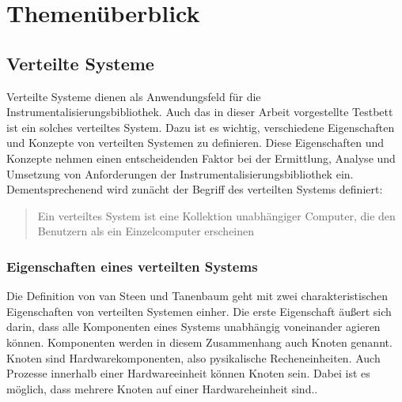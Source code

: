 %

\chapter{Themenüberblick}
\label{chapter:Themenüberblick}

\section{Verteilte Systeme}
\label{section:Verteilte Systeme}

Verteilte Systeme dienen als Anwendungsfeld für die Instrumentalisierungsbibliothek. Auch das in dieser Arbeit vorgestellte Testbett ist ein solches verteiltes System. Dazu ist es wichtig,  verschiedene Eigenschaften und Konzepte von verteilten Systemen zu definieren. Diese Eigenschaften und Konzepte nehmen einen entscheidenden Faktor bei der Ermittlung, Analyse und Umsetzung von Anforderungen der Instrumentalisierungsbibliothek ein. Dementsprechenend wird zunächt der Begriff des verteilten Systems definiert:

\begin{quote}
	Ein verteiltes System ist eine Kollektion unabhängiger Computer, die den Benutzern als ein Einzelcomputer erscheinen 
\end{quote}

\subsection{Eigenschaften eines verteilten Systems}
\label{subsection:Eigenschaften eines verteilten Systems}
	Die Definition von van Steen und Tanenbaum geht mit zwei charakteristischen Eigenschaften von verteilten Systemen einher. Die erste Eigenschaft äußert sich darin, dass alle Komponenten eines Systems unabhängig voneinander agieren können. Komponenten werden in diesem Zusammenhang auch Knoten genannt. Knoten sind Hardwarekomponenten, also pysikalische Recheneinheiten. Auch Prozesse innerhalb einer Hardwareeinheit können Knoten sein. Dabei ist es möglich, dass mehrere Knoten auf einer Hardwareheinheit sind..

